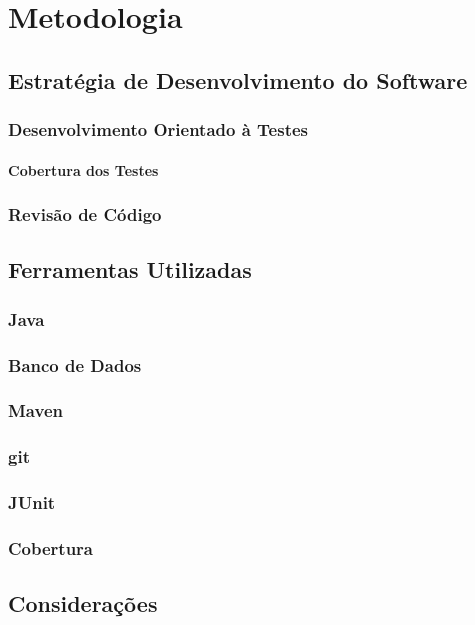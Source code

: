 
\chapter{Metodologia}

\section{Estratégia de Desenvolvimento do Software}

\subsection{Desenvolvimento Orientado à Testes}

\subsubsection{Cobertura dos Testes}

\subsection{Revisão de Código}

\section{Ferramentas Utilizadas}

\subsection{Java}

\subsection{Banco de Dados}

\subsection{Maven}

\subsection{git}

\subsection{JUnit}

\subsection{Cobertura}

\section{Considerações}

